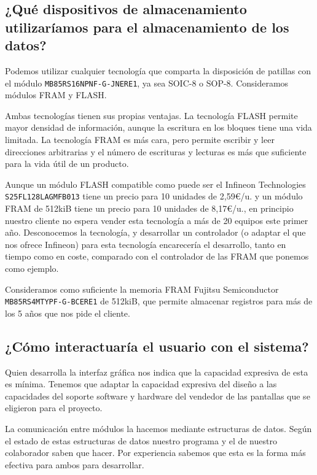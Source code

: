 \subsection{¿Qué dispositivos de almacenamiento utilizaríamos para el almacenamiento de los datos?}

Podemos utilizar cualquier tecnología que comparta la disposición de patillas con el módulo \linebreak \texttt{MB85RS16NPNF-G-JNERE1},
ya sea SOIC-8 o SOP-8. Consideramos módulos FRAM y FLASH.

Ambas tecnologías tienen sus propias ventajas. La tecnología FLASH permite mayor densidad de información,
aunque la escritura en los bloques tiene una vida limitada. La tecnología FRAM es más cara, pero permite
escribir y leer direcciones arbitrarias y el número de escrituras y lecturas es más que suficiente para la vida
útil de un producto.

Aunque un módulo FLASH compatible como puede ser el Infineon Technologies \linebreak \texttt{S25FL128LAGMFB013} tiene un
precio para 10 unidades de 2,59€/u. y un módulo FRAM de 512kiB tiene un precio para 10 unidades de
8,17€/u., en principio nuestro cliente no espera vender esta tecnología a más de 20 equipos este primer año.
Desconocemos la tecnología, y desarrollar un controlador (o adaptar el que nos ofrece Infineon) para esta tecnología
encarecería el desarrollo, tanto en tiempo como en coste, comparado con el controlador de las FRAM que ponemos como ejemplo.

Consideramos como suficiente la memoria FRAM Fujitsu Semiconductor \linebreak \texttt{MB85RS4MTYPF-G-BCERE1} de 512kiB,
que permite almacenar registros para más de los 5 años que nos pide el cliente.

\subsection{¿Cómo interactuaría el usuario con el sistema?}

Quien desarrolla la interfaz gráfica nos indica que la capacidad
expresiva de esta es mínima. Tenemos que adaptar la capacidad
expresiva del diseño a las capacidades del soporte software y
hardware del vendedor de las pantallas que se eligieron para el proyecto.

La comunicación entre módulos la hacemos mediante estructuras de datos.
Según el estado de estas estructuras de datos nuestro programa y el de
nuestro colaborador saben que hacer. Por experiencia sabemos que esta
es la forma más efectiva para ambos para desarrollar.

